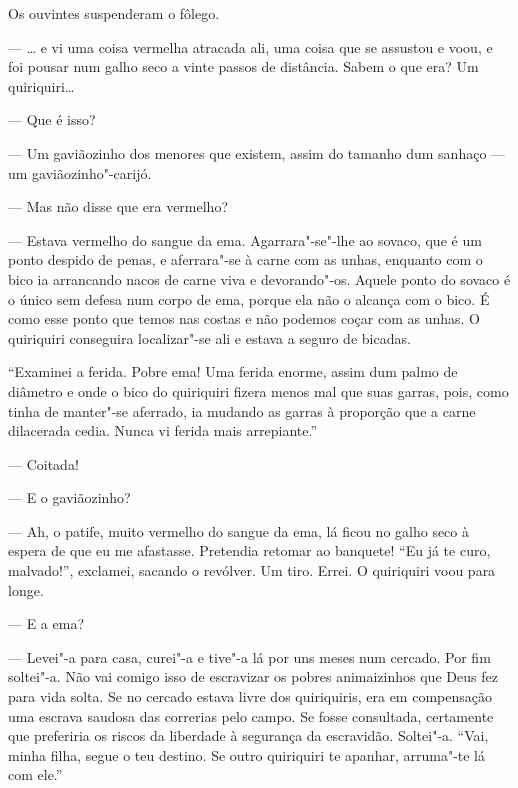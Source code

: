 Os ouvintes suspenderam o fôlego.

--- \ldots{} e vi uma coisa vermelha atracada ali, uma coisa que se assustou
e voou, e foi pousar num galho seco a vinte passos de distância. Sabem o
que era? Um quiriquiri\ldots{}

--- Que é isso?

--- Um gaviãozinho dos menores que existem, assim do tamanho dum sanhaço
--- um gaviãozinho"-carijó.

--- Mas não disse que era vermelho?

--- Estava vermelho do sangue da ema. Agarrara"-se"-lhe ao sovaco, que é
um ponto despido de penas, e aferrara"-se à carne com as unhas, enquanto
com o bico ia arrancando nacos de carne viva e devorando"-os. Aquele
ponto do sovaco é o único sem defesa num corpo de ema, porque ela não o
alcança com o bico. É como esse ponto que temos nas costas e não podemos
coçar com as unhas. O quiriquiri conseguira localizar"-se ali e estava a
seguro de bicadas.

``Examinei a ferida. Pobre ema! Uma ferida enorme, assim dum palmo de
diâmetro e onde o bico do quiriquiri fizera menos mal que suas garras,
pois, como tinha de manter"-se aferrado, ia mudando as garras à proporção
que a carne dilacerada cedia. Nunca vi ferida mais arrepiante.''

--- Coitada!


--- E o gaviãozinho?

--- Ah, o patife, muito vermelho do sangue da ema, lá ficou no galho
seco à espera de que eu me afastasse. Pretendia retomar ao banquete!
``Eu já te curo, malvado!'', exclamei, sacando o revólver. Um tiro.
Errei. O quiriquiri voou para longe.

--- E a ema?

--- Levei"-a para casa, curei"-a e tive"-a lá por uns meses num cercado.
Por fim soltei"-a. Não vai comigo isso de escravizar os pobres
animaizinhos que Deus fez para vida solta. Se no cercado estava livre
dos quiriquiris, era em compensação uma escrava saudosa das correrias
pelo campo. Se fosse consultada, certamente que preferiria os riscos da
liberdade à segurança da escravidão. Soltei"-a. ``Vai, minha filha, segue
o teu destino. Se outro quiriquiri te apanhar, arruma"-te lá com ele.''

